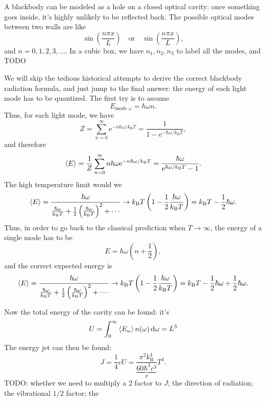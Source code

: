 \documentclass[hyperref, a4paper]{article}
\newcommand*{\ee}{\mathrm{e}}
\newcommand{\kB}{k_{\text{B}}}
\begin{document}
A blackbody can be modeled as a hole on a closed optical cavity:
once something goes inside, 
it's highly unlikely to be reflected back.
The possible optical modes between two walls are like 
\[
    \sin(\frac{n \pi x}{L}) \quad \text{or} \quad 
    \sin(\frac{n \pi x}{L}),
\]
and $n = 0, 1, 2, 3, \dots$.
In a cubic box, we have $n_1, n_2, n_3$ to label all the modes, 
and TODO 

We will skip the tedious historical attempts to derive the correct blackbody radiation formula,
and just jump to the final answer:
the energy of each light mode has to be quantized.
The first try is to assume 
\begin{equation}
    E_{\text{mode $\omega$}} = \hbar \omega n.
\end{equation}
Thus, for each light mode, we have 
\begin{equation}
    Z = \sum_{n=0}^\infty \ee^{- n \hbar \omega / \kB T} = \frac{1}{1 - \ee^{- \hbar \omega / \kB T}} ,
\end{equation}
and therefore 
\begin{equation}
    \expval{E} = \frac{1}{Z} \sum_{n=0}^\infty n \hbar \omega \ee^{- n \hbar \omega / \kB T} 
    = \frac{\hbar \omega}{\ee^{\hbar \omega / \kB T} - 1}.
\end{equation}
The high temperature limit would we 
\[
    \expval{E} = \frac{\hbar \omega}{
        \frac{\hbar \omega}{\kB T} + \frac{1}{2} \left(\frac{\hbar \omega}{\kB T}\right)^2 + \cdots 
    } \to 
    \kB T \left(
        1 - \frac{1}{2} \frac{\hbar \omega}{\kB T} 
    \right) = \kB T - \frac{1}{2} \hbar \omega.
\]
Thus, in order to go back to the classical prediction when $T \to \infty$, 
the energy of a single mode has to be 
\begin{equation}
    E = \hbar \omega \left( n + \frac{1}{2} \right),
\end{equation}
and the correct expected energy is 
\begin{equation}
    \expval{E} = \frac{\hbar \omega}{
        \frac{\hbar \omega}{\kB T} + \frac{1}{2} \left(\frac{\hbar \omega}{\kB T}\right)^2 + \cdots 
    } \to 
    \kB T \left(
        1 - \frac{1}{2} \frac{\hbar \omega}{\kB T} 
    \right) = \kB T - \frac{1}{2} \hbar \omega
    + \frac{1}{2} \hbar \omega.
\end{equation}

Now the total energy of the cavity can be found: 
it's 
\begin{equation}
    U = \int_0^\infty \expval{E_\omega} n(\omega) \dd{\omega}
    = L^3 
\end{equation}
The energy jet can then be found:
\begin{equation}
    J = \frac{1}{4} c U = \underbrace{\frac{\pi^2 \kB^4}{60 \hbar^3 c^3}}_{\sigma} T^4.
\end{equation}
TODO: whether we need to multiply a 2 factor to $J$;
the direction of radiation; 
the vibrational $1/2$ factor; 
the 
\end{document}
